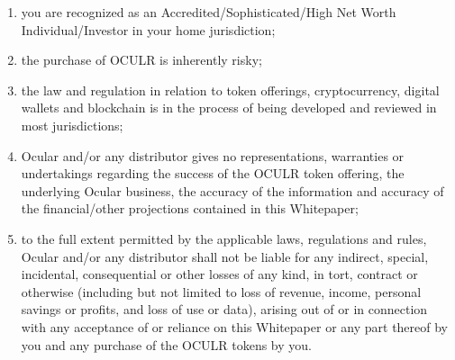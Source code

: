 \documentclass[a4paper]{article}
\begin{document}
\begin{enumerate}
\item you are recognized as an Accredited/Sophisticated/High Net Worth Individual/Investor in your home jurisdiction; 
\item the purchase of OCULR is inherently risky; 
\item the law and regulation in relation to token offerings, cryptocurrency, digital wallets and blockchain is in the process of being developed and reviewed in most jurisdictions;
\item Ocular and/or any distributor gives no representations, warranties or undertakings regarding the success of the OCULR token offering, the underlying Ocular business, the accuracy of the information and accuracy of the financial/other projections contained in this Whitepaper;
\item to the full extent permitted by the applicable laws, regulations and rules, Ocular and/or any distributor shall not be liable for any indirect, special, incidental, consequential or other losses of any kind, in tort, contract or otherwise (including but not limited to loss of revenue, income, personal savings or profits, and loss of use or data), arising out of or in connection with any acceptance of or reliance on this Whitepaper or any part thereof by you and any purchase of the OCULR tokens by you.
\end{enumerate}
\end{document}
